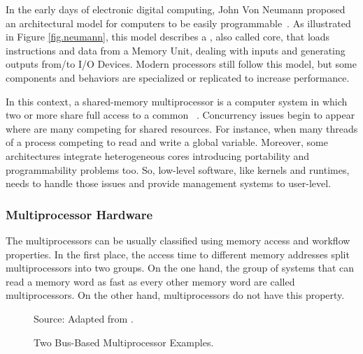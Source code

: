 		In the early days of electronic digital computing, John Von Neumann
		proposed an architectural model for computers to be easily programmable~\cite{von-neumann:model}.
		As illustrated in Figure \ref{fig.neumann}, this model describes a \cpu,
		also called core, that loads instructions and data from a Memory Unit,
		dealing with inputs and generating outputs from/to I/O Devices.
		Modern processors still follow this model, but some components and
		behaviors are specialized or replicated to increase performance.

		In this context, a shared-memory multiprocessor is a computer system
		in which two or more \cpus share full access to a common \ram~\cite{tanenbaum:4ed}.
		Concurrency issues begin to appear where are many \cpus competing for
		shared resources.
		For instance, when many threads of a process competing to read and write a global variable.
		Moreover, some architectures integrate heterogeneous cores introducing portability
		and programmability problems too.
		So, low-level software, like \os kernels and runtimes, needs to handle those
		issues and provide management systems to user-level.

		\subsubsection{Multiprocessor Hardware}
		\label{sec.multiprocessor-hw}

			The multiprocessors can be usually classified using memory access
			and workflow properties.
			In the first place, the access time to different memory addresses
			split multiprocessors into two groups.
			On the one hand, the group of systems that can read a memory word
			as fast as every other memory word are called \uma multiprocessors.
			On the other hand, \numa multiprocessors do not have this property.

			\begin{figure}[t]
				\centering
				\caption{Two Bus-Based \uma Multiprocessor Examples.}

				\qquad

				Source: Adapted from \cite{tanenbaum:4ed}.

				\label{fig:uma}%
			\end{figure}


